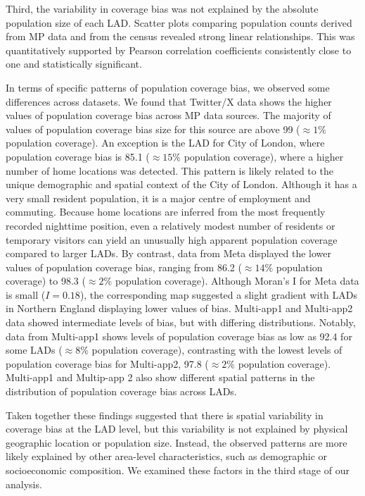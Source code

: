 \documentclass{article}
\begin{document}
Third, the variability in coverage bias was not explained by the
absolute population size of each LAD. Scatter plots comparing population
counts derived from MP data and from the census revealed strong linear
relationships. This was quantitatively supported by Pearson correlation
coefficients consistently close to one and statistically significant.

In terms of specific patterns of population coverage bias, we observed
some differences across datasets. We found that Twitter/X data shows the
higher values of population coverage bias across MP data sources. The
majority of values of population coverage bias size for this source are
above 99 (\(\approx 1 \%\) population coverage). An exception is the LAD
for City of London, where population coverage bias is 85.1
(\(\approx 15 \%\) population coverage), where a higher number of home
locations was detected. This pattern is likely related to the unique
demographic and spatial context of the City of London. Although it has a
very small resident population, it is a major centre of employment and
commuting. Because home locations are inferred from the most frequently
recorded nighttime position, even a relatively modest number
of residents or temporary visitors can yield an unusually high apparent
population coverage compared to larger LADs. By contrast, data from Meta
displayed the lower values of population coverage bias, ranging from
86.2 (\(\approx 14 \%\) population coverage) to 98.3 (\(\approx 2 \%\)
population coverage). Although Moran's I for Meta data is small
(\(I = 0.18\)), the corresponding map suggested a slight gradient with
LADs in Northern England displaying lower values of bias. Multi-app1 and
Multi-app2 data showed intermediate levels of bias, but with differing
distributions. Notably, data from Multi-app1 shows levels of population
coverage bias as low as 92.4 for some LADs (\(\approx 8 \%\) population
coverage), contrasting with the lowest levels of population coverage
bias for Multi-app2, 97.8 (\(\approx 2\%\) population coverage).
Multi-app1 and Multip-app 2 also show different spatial patterns in the
distribution of population coverage bias across LADs.

Taken together these findings suggested that there is spatial
variability in coverage bias at the LAD level, but this variability is
not explained by physical geographic location or population size.
Instead, the observed patterns are more likely explained by other
area-level characteristics, such as demographic or socioeconomic
composition. We examined these factors in the third stage of our
analysis.
\end{document}
